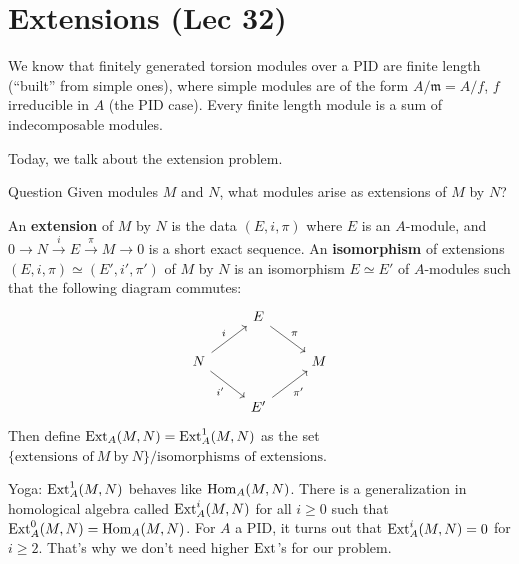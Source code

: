 \section{Extensions (Lec 32)} 
We know that finitely generated torsion modules over a PID are finite length (``built'' from simple ones), where simple modules are of the form $A / \mathfrak m = A / f$, $f$ irreducible in $A$ (the PID case). Every finite length module is a sum of indecomposable modules.

Today, we talk about the extension problem. 
\begin{namedthing}{Question} 
   Given modules $M$ and $N$, what modules arise as extensions of $M$ by $N$? 
\end{namedthing}

\begin{definition}[]
    An \textbf{extension} of $M$ by $N$ is the data $(E, i, \pi)$ where $E$ is an $A$-module, and $0 \to N \xrightarrow i E \xrightarrow{\pi} M \to  0$ is a short exact sequence. An \textbf{isomorphism} of extensions $(E, i, \pi) \simeq  (E' ,i', \pi ')$ of $M$ by $N$ is an isomorphism $E \simeq  E'$ of $A$-modules such that the following diagram commutes:
    \[
    \begin{tikzcd}
                                    & E \arrow[rd, "\pi"]    &   \\
N \arrow[ru, "i"] \arrow[rd, "i'"'] &                        & M \\
                                    & E' \arrow[ru, "\pi'"'] &  
\end{tikzcd}
    \] Then define  $\operatorname{Ext}_A(M,N) = \operatorname{Ext}_A^1(M,N)$ as the set $\{ \text{extensions of} \ M \ \text{by} \ N\} / \text{isomorphisms of extensions} $.
\end{definition}
\begin{remark}
    Yoga: $\operatorname{Ext}_A^1(M,N)$ behaves like $\operatorname{Hom}_A(M,N)$.
    There is a generalization in homological algebra called $\operatorname{Ext} ^i _A(M,N)$ for all $i\geq 0$ such that $\operatorname{Ext}_A^0(M,N)=\operatorname{Hom}_A(M,N)$. For $A$ a PID, it turns out that  $\operatorname{Ext}_A ^i (M,N)=0$ for $i\geq 2$. That's why we don't need higher $\operatorname{Ext}$'s for our problem.
\end{remark}
